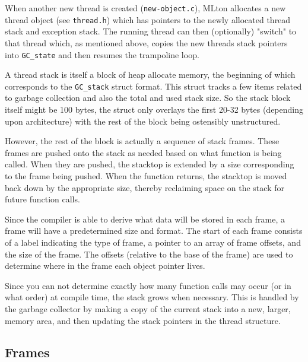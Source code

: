 When another new thread is created (\texttt{new-object.c}), MLton allocates a new thread object (see \texttt{thread.h}) which has pointers to the newly allocated thread stack and exception stack. The running thread can then (optionally) "switch" to that thread which, as mentioned above, copies the new threads stack pointers into \texttt{GC\_state} and then resumes the trampoline loop.

A thread stack is itself a block of heap allocate memory, the beginning of which corresponds to the \texttt{GC\_stack} struct format. This struct tracks a few items related to garbage collection and also the total and used stack size. So the stack block itself might be 100 bytes, the struct only overlays the first 20-32 bytes (depending upon architecture) with the rest of the block being ostensibly unstructured. 

However, the rest of the block is actually a sequence of stack frames. These frames are pushed onto the stack as needed based on what function is being called. When they are pushed, the stacktop is extended by a size corresponding to the frame being pushed. When the function returns, the stacktop is moved back down by the appropriate size, thereby reclaiming space on the stack for future function calls. 

Since the compiler is able to derive what data will be stored in each frame, a frame will have a predetermined size and format. The start of each frame consists of a label indicating the type of frame, a pointer to an array of frame offsets, and the size of the frame. The offsets (relative to the base of the frame) are used to determine where in the frame each object pointer lives. 

Since you can not determine exactly how many function calls may occur (or in what order) at compile time, the stack grows when necessary. This is handled by the garbage collector by making a copy of the current stack into a new, larger, memory area, and then updating the stack pointers in the thread structure. 

\subsection{Frames}

